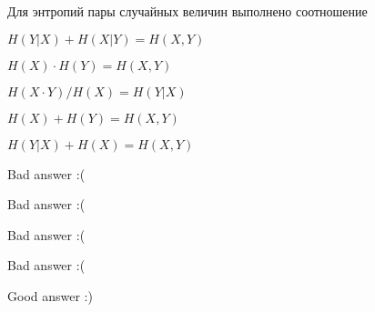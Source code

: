 
\begin{question}
Для энтропий пары случайных величин выполнено соотношение
\begin{answerlist}[2]
  \item \(H(Y|X) + H(X|Y) = H(X, Y)\)
  \item \(H(X) \cdot H(Y) = H(X, Y)\)
  \item \(H(X\cdot Y) / H(X) = H(Y|X)\)
  \item \(H(X) + H(Y) = H(X, Y)\)
  \item \(H(Y|X) + H(X) = H(X, Y)\)
\end{answerlist}
\end{question}

\begin{solution}
\begin{answerlist}
  \item Bad answer :(
  \item Bad answer :(
  \item Bad answer :(
  \item Bad answer :(
  \item Good answer :)
\end{answerlist}
\end{solution}
